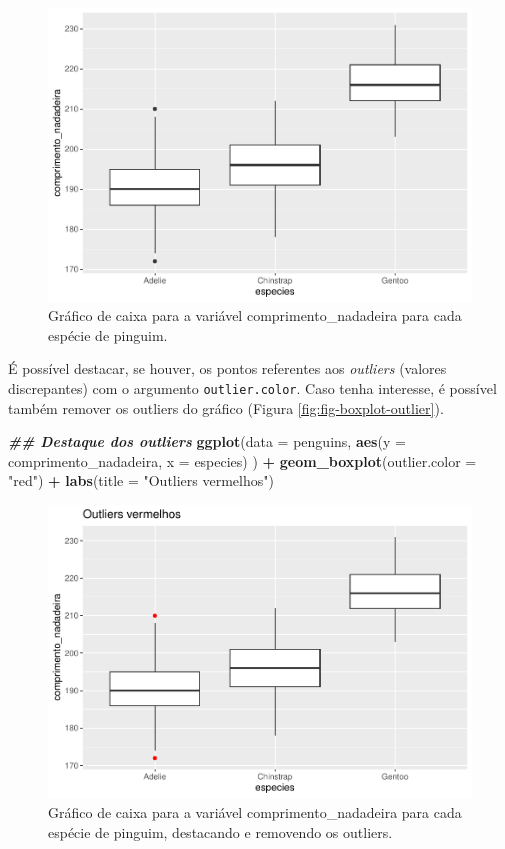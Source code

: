 \documentclass[
]{article}
\newenvironment{Shaded}{\begin{snugshade}}{\end{snugshade}}
\newcommand{\AttributeTok}[1]{\textcolor[rgb]{0.13,0.29,0.53}{#1}}
\newcommand{\DocumentationTok}[1]{\textcolor[rgb]{0.56,0.35,0.01}{\textbf{\textit{#1}}}}
\newcommand{\FunctionTok}[1]{\textcolor[rgb]{0.13,0.29,0.53}{\textbf{#1}}}
\newcommand{\NormalTok}[1]{#1}
\newcommand{\SpecialCharTok}[1]{\textcolor[rgb]{0.81,0.36,0.00}{\textbf{#1}}}
\newcommand{\StringTok}[1]{\textcolor[rgb]{0.31,0.60,0.02}{#1}}
\begin{document}
\begin{figure}
\includegraphics[width=0.75\linewidth,height=0.75\textheight]{epr_files/figure-latex/fig-boxplot-1} \caption{Gráfico de caixa para a variável comprimento_nadadeira para cada espécie de pinguim.}\label{fig:fig-boxplot}
\end{figure}

É possível destacar, se houver, os pontos referentes aos \emph{outliers} (valores discrepantes) com o argumento \texttt{outlier.color}. Caso tenha interesse, é possível também remover os outliers do gráfico (Figura \ref{fig:fig-boxplot-outlier}).

\begin{Shaded}
\begin{Highlighting}[]
\DocumentationTok{\#\# Destaque dos outliers}
\FunctionTok{ggplot}\NormalTok{(}\AttributeTok{data =}\NormalTok{ penguins, }
       \FunctionTok{aes}\NormalTok{(}\AttributeTok{y =}\NormalTok{ comprimento\_nadadeira, }\AttributeTok{x =}\NormalTok{ especies)}
\NormalTok{       ) }\SpecialCharTok{+}
    \FunctionTok{geom\_boxplot}\NormalTok{(}\AttributeTok{outlier.color =} \StringTok{"red"}\NormalTok{) }\SpecialCharTok{+}
    \FunctionTok{labs}\NormalTok{(}\AttributeTok{title =} \StringTok{"Outliers vermelhos"}\NormalTok{)}
\end{Highlighting}
\end{Shaded}

\begin{figure}
\includegraphics[width=0.75\linewidth,height=0.75\textheight]{epr_files/figure-latex/fig-boxplot-outlier-1} \caption{Gráfico de caixa para a variável comprimento_nadadeira para cada espécie de pinguim, destacando e removendo os outliers.}\label{fig:fig-boxplot-outlier-1}
\end{figure}
\end{document}

